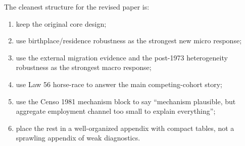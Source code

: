 \documentclass[11pt]{article}
\begin{document}
The cleanest structure for the revised paper is:
\begin{enumerate}[leftmargin=*]
\item keep the original core design;
\item use birthplace/residence robustness as the strongest new micro response;
\item use the external migration evidence and the post-1973 heterogeneity robustness as the strongest macro response;
\item use Law 56 horse-race to answer the main competing-cohort story;
\item use the Censo 1981 mechanism block to say ``mechanism plausible, but aggregate employment channel too small to explain everything'';
\item place the rest in a well-organized appendix with compact tables, not a sprawling appendix of weak diagnostics.
\end{enumerate}
\end{document}
